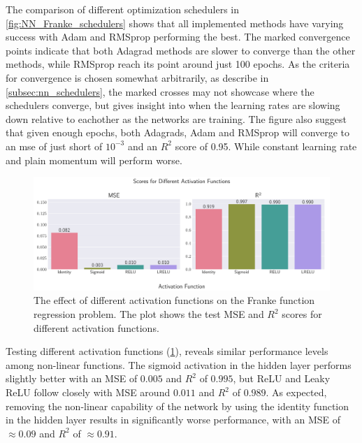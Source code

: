The comparison of different optimization schedulers in \cref{fig:NN_Franke_schedulers} shows that all implemented methods have varying success with Adam and RMSprop performing the best. The marked convergence points indicate that both Adagrad methods are slower to converge than the other methods, while RMSprop reach its point around just 100 epochs. As the criteria for convergence is chosen somewhat arbitrarily, as describe in \cref{subsec:nn_schedulers}, the marked crosses may not showcase where the schedulers converge, but gives insight into when the learning rates are slowing down relative to eachother as the networks are training. The figure also suggest that given enough epochs, both Adagrads, Adam and RMSprop will converge to an mse of just short of \( 10^{-3} \) and an \( R^2 \) score of 0.95. While constant learning rate and plain momentum will perform worse.

\onecolumngrid
\begin{figure}[ht!]
    \centering
    \includegraphics[width = .9\textwidth]{../figs/c_activation_funcs.pdf}
    \caption{The effect of different activation functions on the Franke function regression problem. The plot shows the test MSE and \( R^2 \) scores for different activation functions.}
    \label{fig:NN_Franke_activation}
\end{figure}
\twocolumngrid

Testing different activation functions (\cref{fig:NN_Franke_activation}), reveals similar performance levels among non-linear functions. The sigmoid activation in the hidden layer performs slightly better with an MSE of $0.005$ and $R^2$ of $0.995$, but ReLU and Leaky ReLU follow closely with MSE around $0.011$ and $R^2$ of $0.989$. As expected, removing the non-linear capability of the network by using the identity function in the hidden layer results in significantly worse performance, with an MSE of $\approx 0.09$ and $R^2$ of $\approx0.91$.

